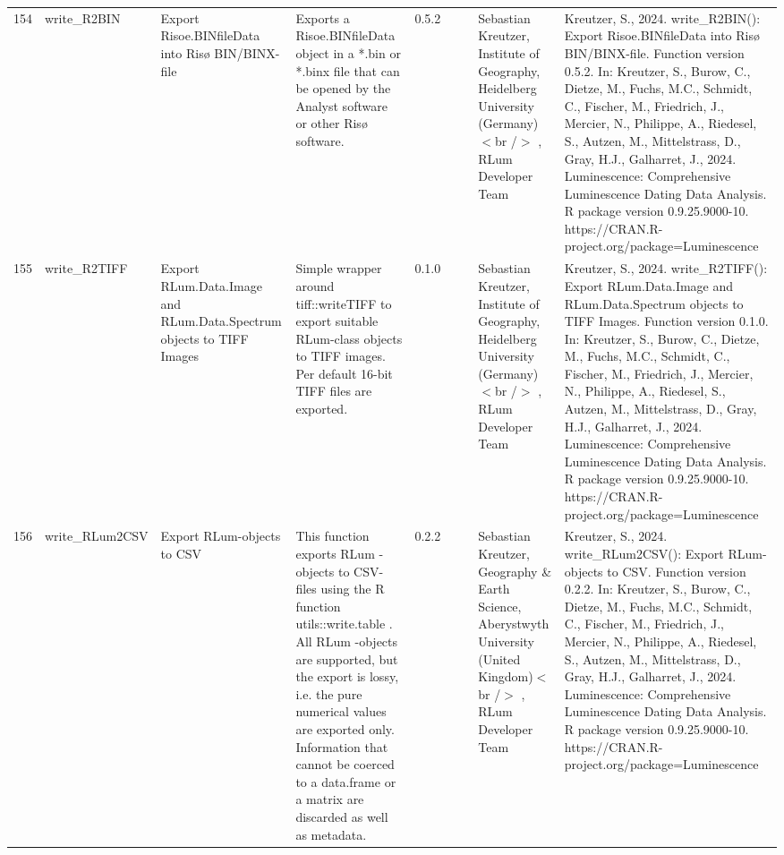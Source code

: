 \begin{table}[ht]
\begin{tabular}{rllllllll}
 \\ 
  154 & write\_R2BIN & Export Risoe.BINfileData into Risø BIN/BINX-file & Exports a  Risoe.BINfileData  object in a  *.bin  or  *.binx  file that can be opened by the Analyst software or other Risø software. & 0.5.2
 &  &  & Sebastian Kreutzer, Institute of Geography, Heidelberg University (Germany)$<$br /$>$ , RLum Developer Team & Kreutzer, S., 2024. write\_R2BIN(): Export Risoe.BINfileData into Risø BIN/BINX-file. Function version 0.5.2. In: Kreutzer, S., Burow, C., Dietze, M., Fuchs, M.C., Schmidt, C., Fischer, M., Friedrich, J., Mercier, N., Philippe, A., Riedesel, S., Autzen, M., Mittelstrass, D., Gray, H.J., Galharret, J., 2024. Luminescence: Comprehensive Luminescence Dating Data Analysis. R package version 0.9.25.9000-10. https://CRAN.R-project.org/package=Luminescence
 \\ 
  155 & write\_R2TIFF & Export RLum.Data.Image and RLum.Data.Spectrum objects to TIFF Images & Simple wrapper around  tiff::writeTIFF  to export suitable RLum-class objects to TIFF images. Per default 16-bit TIFF files are exported. & 0.1.0
 &  &  & Sebastian Kreutzer, Institute of Geography, Heidelberg University (Germany)$<$br /$>$ , RLum Developer Team & Kreutzer, S., 2024. write\_R2TIFF(): Export RLum.Data.Image and RLum.Data.Spectrum objects to TIFF Images. Function version 0.1.0. In: Kreutzer, S., Burow, C., Dietze, M., Fuchs, M.C., Schmidt, C., Fischer, M., Friedrich, J., Mercier, N., Philippe, A., Riedesel, S., Autzen, M., Mittelstrass, D., Gray, H.J., Galharret, J., 2024. Luminescence: Comprehensive Luminescence Dating Data Analysis. R package version 0.9.25.9000-10. https://CRAN.R-project.org/package=Luminescence
 \\ 
  156 & write\_RLum2CSV & Export RLum-objects to CSV & This function exports  RLum -objects to CSV-files using the R function utils::write.table . All  RLum -objects are supported, but the export is lossy, i.e. the pure numerical values are exported only. Information that cannot be coerced to a  data.frame  or a  matrix  are discarded as well as metadata. & 0.2.2
 &  &  & Sebastian Kreutzer, Geography \& Earth Science, Aberystwyth University (United Kingdom)$<$br /$>$ , RLum Developer Team & Kreutzer, S., 2024. write\_RLum2CSV(): Export RLum-objects to CSV. Function version 0.2.2. In: Kreutzer, S., Burow, C., Dietze, M., Fuchs, M.C., Schmidt, C., Fischer, M., Friedrich, J., Mercier, N., Philippe, A., Riedesel, S., Autzen, M., Mittelstrass, D., Gray, H.J., Galharret, J., 2024. Luminescence: Comprehensive Luminescence Dating Data Analysis. R package version 0.9.25.9000-10. https://CRAN.R-project.org/package=Luminescence
 \\ 
   \hline
\end{tabular}
\end{table}

